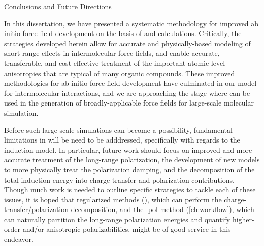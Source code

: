\begin{chapter}{Conclusions and Future Directions}
\label{ch:conclusions}

In this dissertation, we have presented a systematic methodology for improved
ab initio force field development on the basis of \sapt and \isa calculations.
Critically, the strategies developed herein allow for accurate and
physically-based modeling of short-range effects in intermolecular force
fields, and enable accurate, transferable, and cost-effective treatment of the
important atomic-level anisotropies that are typical of many organic
compounds. These improved methodologies for ab initio force field development
have culminated in our \mastiff model for intermolecular interactions, and we
are approaching the stage where \mastiff can be used in the generation of
broadly-applicable force fields for large-scale molecular simulation. 

Before such large-scale simulations can become a possibility, fundamental limitations in
\mastiff  will be need to be
adddressed, specifically with regards to the induction model.
In particular, future work should focus on improved and more accurate treatment of the long-range polarization, 
the development of new models to more physically treat the polarization
damping, and the decomposition of the total induction energy into
charge-transfer and polarization contributions.
Though much work is needed to outline
specific strategies to tackle each of these issues, it is hoped that
regularized \sapt methods (), which can perform the
charge-transfer/polarization decomposition, and the \isa-pol method
(\cref{ch:workflow}), which can naturally partition the long-range polarization
energies and quantify higher-order and/or anisotropic polarizabilities, might
be of good service in this endeavor. 


\end{chapter}
